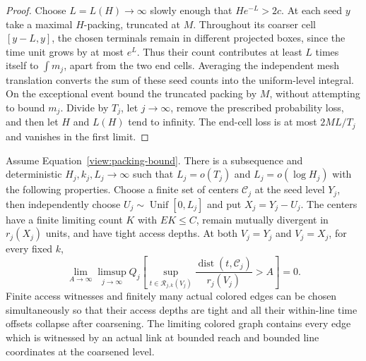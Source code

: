 \begin{proof}
Choose $L=L(H)\to\infty$ slowly enough that $He^{-L}>2c$.  At each seed
$y$ take a maximal $H$-packing, truncated at $M$.  Throughout its coarser
cell $[y-L,y]$, the chosen terminals remain in different projected boxes,
since the time unit grows by at most $e^L$.  Thus their count contributes
at least $L$ times itself to $\int m_j$, apart from the two end cells.
Averaging the independent mesh translation converts the sum of these
seed counts into the uniform-level integral.  On the exceptional event
bound the truncated packing by $M$, without attempting to bound $m_j$.
Divide by $T_j$, let $j\to\infty$, remove the prescribed probability loss,
and then let $H$ and $L(H)$ tend to infinity.  The end-cell loss is at most
$2ML/T_j$ and vanishes in the first limit.
\end{proof}

\begin{proposition}
\label{view:saturation}
Assume Equation~\eqref{view:packing-bound}.  There is a subsequence and
deterministic $H_j,k_j,L_j\to\infty$ such that
$L_j=o(T_j)$ and $L_j=o(\log H_j)$ with the following properties.
Choose a finite set of centers $\mathcal C_j$ at the seed level $Y_j$,
then independently choose $U_j\sim\operatorname{Unif}[0,L_j]$ and put
$X_j=Y_j-U_j$.  The centers have a finite limiting count $K$ with
$E K\le C$, remain mutually divergent in $r_j(X_j)$ units, and have tight
access depths.  At both $V_j=Y_j$ and $V_j=X_j$, for every fixed $k$,
\begin{equation}\label{view:uniform-target-coverage}
 \lim_{A\to\infty}\limsup_{j\to\infty}Q_j\left[
 \sup_{t\in\mathcal R_{j,k}(V_j)}
 \frac{\operatorname{dist}(t,\mathcal C_j)}{r_j(V_j)}>A\right]=0.
\end{equation}
Finite access witnesses and finitely many actual colored edges can be
chosen simultaneously so that their access depths are tight and all
their within-line time offsets collapse after coarsening.  The limiting
colored graph contains every edge which is witnessed by an actual link
at bounded reach and bounded line coordinates at the coarsened level.
\end{proposition}


